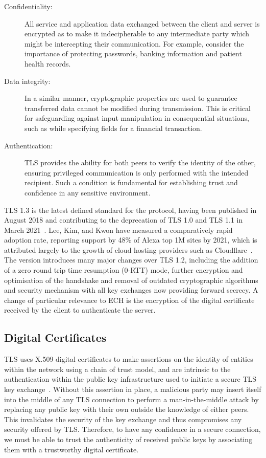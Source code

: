\begin{description}
\item[Confidentiality:] All service and application data exchanged between the client and server is encrypted as to make it indecipherable to any intermediate party which might be intercepting their communication. For example, consider the importance of protecting passwords, banking information and patient health records.
\item[Data integrity:] In a similar manner, cryptographic properties are used to guarantee transferred data cannot be modified during transmission. This is critical for safeguarding against input manipulation in consequential situations, such as while specifying fields for a financial transaction.
\item[Authentication:] TLS provides the ability for both peers to verify the identity of the other, ensuring privileged communication is only performed with the intended recipient. Such a condition is fundamental for establishing trust and confidence in any sensitive environment.
\end{description}

TLS 1.3 is the latest defined standard for the protocol, having been published in August 2018 and contributing to the deprecation of TLS 1.0 and TLS 1.1 in March 2021~\cite{rfc8446, rfc8996}. Lee, Kim, and Kwon have measured a comparatively rapid adoption rate, reporting support by 48\% of Alexa top 1M sites by 2021, which is attributed largely to the growth of cloud hosting providers such as Cloudflare~\cite{holz2019era, lee2021tls}. The version introduces many major changes over TLS 1.2, including the addition of a zero round trip time resumption (0-RTT) mode, further encryption and optimisation of the handshake and removal of outdated cryptographic algorithms and security mechanism with all key exchanges now providing forward secrecy. A change of particular relevance to ECH is the encryption of the digital certificate received by the client to authenticate the server.

\subsection{Digital Certificates}

TLS uses X.509 digital certificates to make assertions on the identity of entities within the network using a chain of trust model, and are intrinsic to the authentication within the public key infrastructure used to initiate a secure TLS key exchange~\cite{rfc4158}. Without this assertion in place, a malicious party may insert itself into the middle of any TLS connection to perform a man-in-the-middle attack by replacing any public key with their own outside the knowledge of either peers. This invalidates the security of the key exchange and thus compromises any security offered by TLS. Therefore, to have any confidence in a secure connection, we must be able to trust the authenticity of received public keys by associating them with a trustworthy digital certificate.


